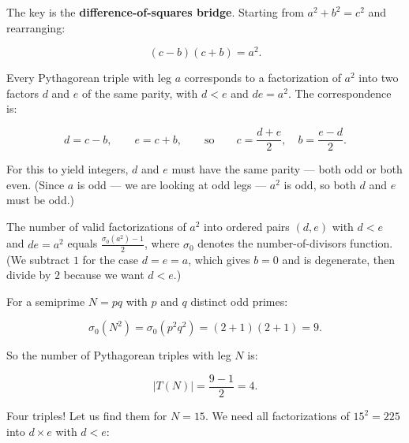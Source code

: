 The key is the \textbf{difference-of-squares bridge}. Starting from \(a^2 + b^2 = c^2\) and rearranging:

\[(c - b)(c + b) = a^2.\]

Every Pythagorean triple with leg \(a\) corresponds to a factorization of \(a^2\) into two factors \(d\) and \(e\) of the same parity, with \(d < e\) and \(de = a^2\). The correspondence is:

\[d = c - b, \qquad e = c + b, \qquad \text{so} \qquad c = \frac{d + e}{2}, \quad b = \frac{e - d}{2}.\]

For this to yield integers, \(d\) and \(e\) must have the same parity --- both odd or both even. (Since \(a\) is odd --- we are looking at odd legs --- \(a^2\) is odd, so both \(d\) and \(e\) must be odd.)

The number of valid factorizations of \(a^2\) into ordered pairs \((d, e)\) with \(d < e\) and \(de = a^2\) equals \(\frac{\sigma_0(a^2) - 1}{2}\), where \(\sigma_0\) denotes the number-of-divisors function. (We subtract \(1\) for the case \(d = e = a\), which gives \(b = 0\) and is degenerate, then divide by \(2\) because we want \(d < e\).)

For a semiprime \(N = pq\) with \(p\) and \(q\) distinct odd primes:

\[\sigma_0(N^2) = \sigma_0(p^2 q^2) = (2 + 1)(2 + 1) = 9.\]

So the number of Pythagorean triples with leg \(N\) is:

\[|T(N)| = \frac{9 - 1}{2} = 4.\]

Four triples! Let us find them for \(N = 15\). We need all factorizations of \(15^2 = 225\) into \(d \times e\) with \(d < e\):


